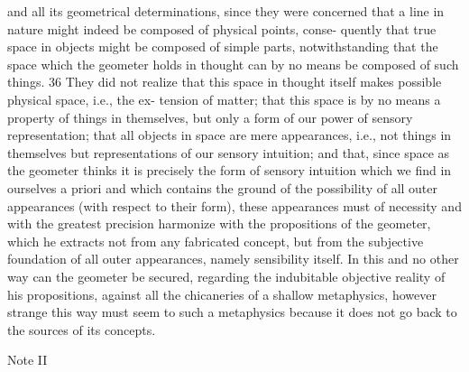 and all its geometrical determinations, since they were concerned that
a line in nature might indeed be composed of physical points, conse-
quently that true space in objects might be composed of simple parts,
notwithstanding that the space which the geometer holds in thought can
by no means be composed of such things. 36 They did not realize that
this space in thought itself makes possible physical space, i.e., the ex-
tension of matter; that this space is by no means a property of things in
themselves, but only a form of our power of sensory representation; that
all objects in space are mere appearances, i.e., not things in themselves
but representations of our sensory intuition; and that, since space as the
geometer thinks it is precisely the form of sensory intuition which we
ﬁnd in ourselves a priori and which contains the ground of the possibility
of all outer appearances (with respect to their form), these appearances
must of necessity and with the greatest precision harmonize with the
propositions of the geometer, which he extracts not from any fabricated
concept, but from the subjective foundation of all outer appearances,
namely sensibility itself. In this and no other way can the geometer be
secured, regarding the indubitable objective reality of his propositions,
against all the chicaneries of a shallow metaphysics, however strange this
way must seem to such a metaphysics because it does not go back to the
sources of its concepts.

Note II

